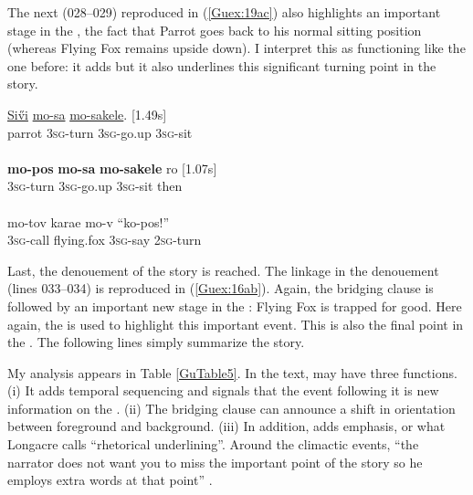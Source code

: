 \documentclass[output=paper]{LSP/langsci}
\begin{document}
The next  (028--029) reproduced in (\ref{Guex:19ac}) also highlights an important stage in the , the fact that Parrot goes back to his normal sitting position (whereas Flying Fox remains upside down). I interpret this  as functioning like the one before: it adds  but it also underlines this significant turning point in the story.

\begin{exe}
\ex \label{Guex:19ac}
\begin{xlist}
\ex \label{Guex:19a}
\gll \underline{Si\H{v}i}   \underline{}        \underline{mo-sa}        \underline{mo-sakele}.           [1.49s]\\
parrot   \textsc{3sg}-turn    \textsc{3sg}-go.up   \textsc{3sg}-sit \\
\glt {}\\
\ex \label{Guex:19b}
\gll \textbf{mo-pos}        \textbf{mo-sa}        \textbf{mo-sakele}          ro [1.07s]\\
\textsc{3sg}-turn    \textsc{3sg}-go.up   \textsc{3sg}-sit   then\\
\glt {}\\
\ex \label{Guex:19c}
\gll   mo-tov   karae     mo-v         ``ko-pos!''\\     	       
 \textsc{3sg}-call   flying.fox   \textsc{3sg}-say   \textsc{2sg}-turn\\
\glt {} 
\end{xlist}
\end{exe}

Last, the denouement of the story is reached. The linkage in the denouement (lines 033--034) is reproduced in (\ref{Guex:16ab}). Again, the bridging clause is followed by an important new stage in the : Flying Fox is trapped for good. Here again, the   is used to highlight this important event. This is also the final point in the . The following lines simply summarize the story. 

My analysis appears in Table \ref{GuTable5}. In the  text,  may have three functions. (i) It adds temporal sequencing and signals that the event following it is new information on the . (ii) The bridging clause can announce a shift in orientation between foreground and background.  (iii) In addition,  adds emphasis, or what Longacre calls ``rhetorical underlining''. Around the climactic events, ``the narrator does not want you to miss the important point of the story so he employs extra words at that point'' \citep[][26]{longacre83}. 
\end{document}
